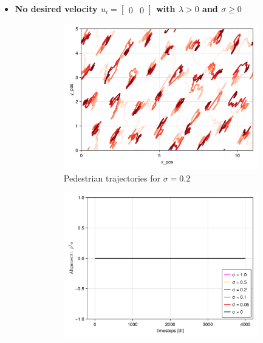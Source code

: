 \begin{itemize}
    \item \textbf{No desired velocity $u_i = \begin{bmatrix} 0 & 0 \end{bmatrix}$ with $\lambda > 0$ and $\sigma \geq 0$}
    \begin{figure}[H]
        \centering
        \begin{subfigure}{.49\textwidth}
            \centering
            \includegraphics[width=\linewidth]{figures/ch5_basic_stoch/traj_stochastic_crys_10000.png}
            \caption{Pedestrian trajectories for $\sigma = 0.2$}
            \label{plot:stoc_crys_traj}
        \end{subfigure}
        \begin{subfigure}{.49\textwidth}
            \centering
            \includegraphics[width=\linewidth]{figures/ch5_basic_stoch/align_stochastic_crys.png}

\end{subfigure}
\end{figure}
\end{itemize}
